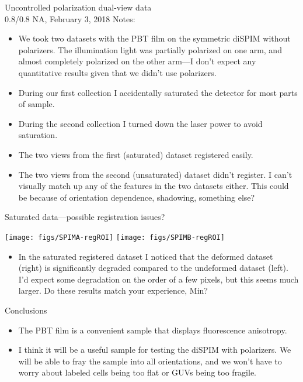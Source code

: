 \documentclass[presentation]{beamer}
\begin{document}
\begin{frame}{Uncontrolled polarization dual-view data\\0.8/0.8 NA, February 3, 2018}
  Notes:
  \begin{itemize}
  \item We took two datasets with the PBT film on the symmetric diSPIM without
    polarizers. The illumination light was partially polarized on one arm, and
    almost completely polarized on the other arm---I don't expect any
    quantitative results given that we didn't use polarizers.
  \item During our first collection I accidentally saturated the detector for
    most parts of sample. 
  \item During the second collection I turned down the laser power to avoid
    saturation.
  \item The two views from the first (saturated) dataset registered easily.
  \item The two views from the second (unsaturated) dataset didn't register. I
    can't visually match up any of the features in the two datasets either. This
    could be because of orientation dependence, shadowing, something else? 
  \end{itemize}
\end{frame}

\begin{frame}{Saturated data---possible registration issues?}
  \begin{center}
    \texttt{[image: figs/SPIMA-regROI]}
    \hspace{1em}
    \texttt{[image: figs/SPIMB-regROI]}    
  \end{center}
  \begin{itemize}
  \item In the saturated registered dataset I noticed that the deformed dataset
    (right) is significantly degraded compared to the undeformed dataset (left).
    I'd expect some degradation on the order of a few pixels, but this seems
    much larger. Do these results match your experience, Min?
  \end{itemize}
\end{frame}


\begin{frame}{Conclusions}
  \begin{itemize}
  \item The PBT film is a convenient sample that displays fluorescence
    anisotropy.
  \item I think it will be a useful sample for testing the diSPIM with
    polarizers. We will be able to fray the sample into all orientations, and
    we won't have to worry about labeled cells being too flat or GUVs
    being too fragile. 
  \end{itemize}
\end{frame}
\end{document}
